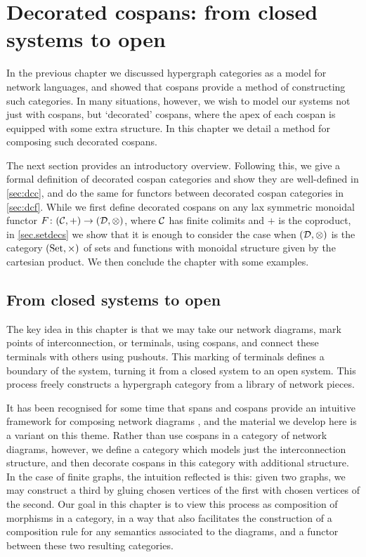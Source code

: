 \chapter{Decorated cospans: from closed systems to open} \label{ch.deccospans}

In the previous chapter we discussed hypergraph categories as a model for
network languages, and showed that cospans provide a method of constructing such
categories. In many situations, however, we wish to model our systems not just
with cospans, but `decorated' cospans, where the apex of each cospan is equipped
with some extra structure. In this chapter we detail a method for composing such
decorated cospans. 

The next section provides an introductory overview. Following this, we give a
formal definition of decorated cospan categories and show they are well-defined
in \textsection\ref{sec:dcc}, and do the same for functors between decorated
cospan categories in \textsection\ref{sec:dcf}. While we first define decorated
cospans on any lax symmetric monoidal functor $F{\colon} (\mathcal C,+) \to
(\mathcal D,\otimes)$, where $\mathcal C$ has finite colimits and $+$ is the
coproduct, in \textsection\ref{sec.setdecs} we show that it is enough to
consider the case when $(\mathcal D, \otimes)$ is the category $(\mathrm{Set},\times)$ of
sets and functions with monoidal structure given by the cartesian product. We
then conclude the chapter with some examples.

\section{From closed systems to open} \label{sec.closedtoopen}

The key idea in this chapter is that we may take our network diagrams, mark
points of interconnection, or terminals, using cospans, and connect these
terminals with others using pushouts. This marking of terminals defines a
boundary of the system, turning it from a closed system to an open system.
This process freely constructs a hypergraph category from a library of network
pieces.

It has been recognised for some time that spans and cospans provide an intuitive
framework for composing network diagrams \cite{KSW}, and the material we develop
here is a variant on this theme. Rather than use cospans in a category of
network diagrams, however, we define a category which models just the
interconnection structure, and then decorate cospans in this category with
additional structure. In the case of finite graphs, the intuition reflected is
this: given two graphs, we may construct a third by gluing chosen vertices of
the first with chosen vertices of the second. Our goal in this chapter is to
view this process as composition of morphisms in a category, in a way that also
facilitates the construction of a composition rule for any semantics associated
to the diagrams, and a functor between these two resulting categories.


